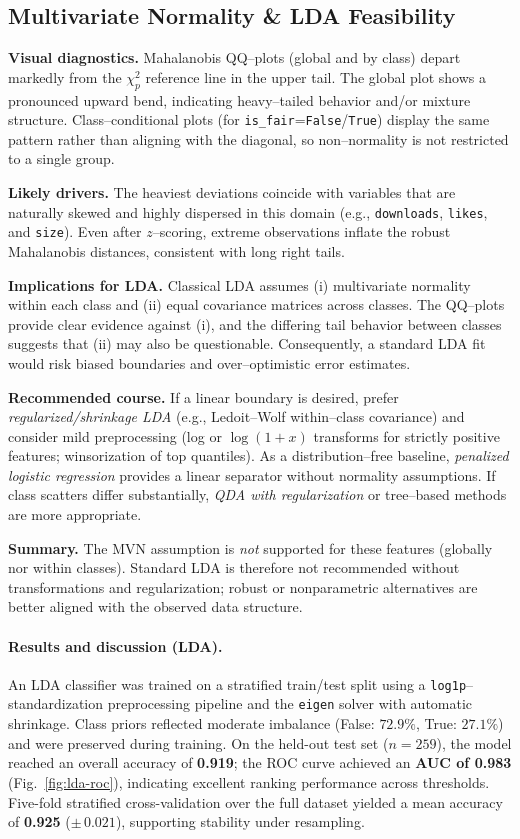 \documentclass[journal]{IEEEtran}
\begin{document}
\subsection{Multivariate Normality \& LDA Feasibility}

\textbf{Visual diagnostics.} Mahalanobis QQ–plots (global and by class) depart markedly from the
$\chi^2_p$ reference line in the upper tail. The global plot shows a pronounced upward bend,
indicating heavy–tailed behavior and/or mixture structure. Class–conditional plots (for
\texttt{is\_fair}=\texttt{False}/\texttt{True}) display the same pattern rather than aligning with
the diagonal, so non–normality is not restricted to a single group.

\textbf{Likely drivers.} The heaviest deviations coincide with variables that are naturally
skewed and highly dispersed in this domain (e.g., \texttt{downloads}, \texttt{likes}, and
\texttt{size}). Even after $z$–scoring, extreme observations inflate the robust Mahalanobis
distances, consistent with long right tails.

\textbf{Implications for LDA.} Classical LDA assumes (i) multivariate normality within each
class and (ii) equal covariance matrices across classes. The QQ–plots provide clear evidence
against (i), and the differing tail behavior between classes suggests that (ii) may also be
questionable. Consequently, a standard LDA fit would risk biased boundaries and over–optimistic
error estimates.

\textbf{Recommended course.} If a linear boundary is desired, prefer \emph{regularized/shrinkage
	LDA} (e.g., Ledoit–Wolf within–class covariance) and consider mild preprocessing (log or
$\log(1+x)$ transforms for strictly positive features; winsorization of top quantiles). As a
distribution–free baseline, \emph{penalized logistic regression} provides a linear separator
without normality assumptions. If class scatters differ substantially, \emph{QDA with
	regularization} or tree–based methods are more appropriate.

\textbf{Summary.} The MVN assumption is \emph{not} supported for these features (globally nor
within classes). Standard LDA is therefore not recommended without transformations and
regularization; robust or nonparametric alternatives are better aligned with the observed data
structure.


\paragraph{Results and discussion (LDA).}
An LDA classifier was trained on a stratified train/test split using a \texttt{log1p}--standardization preprocessing pipeline and the \texttt{eigen} solver with automatic shrinkage. Class priors reflected moderate imbalance (False: $72.9\%$, True: $27.1\%$) and were preserved during training. On the held-out test set ($n=259$), the model reached an overall accuracy of \textbf{0.919}; the ROC curve achieved an \textbf{AUC of 0.983} (Fig.~\ref{fig:lda-roc}), indicating excellent ranking performance across thresholds. Five-fold stratified cross-validation over the full dataset yielded a mean accuracy of \textbf{0.925} ($\pm\,0.021$), supporting stability under resampling.
\end{document}
